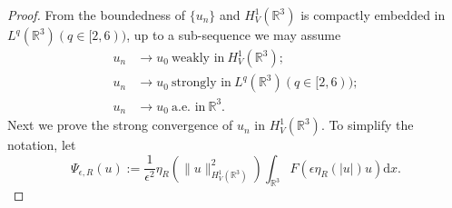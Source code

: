 \documentclass[12pt]{amsart}
\numberwithin{equation}{section}
\theoremstyle{definition}
\begin{document}
\begin{proof}
From the boundedness of $\{u_n\}$ and $H^{1}_{V}(\mathbb{R}^{3})$ is compactly embedded in $L^q(\mathbb{R}^3)(q\in[2,6))$, up to a sub-sequence we may assume
\begin{equation*}
		\begin{split}
	u_n&\to u_0~\text{weakly in}~H^{1}_{V}(\mathbb{R}^3);\\
	u_n&\to u_0~\text{strongly in}~L^{q}(\mathbb{R}^3)(q\in[2,6));\\
	u_n&\to u_0~\text{a.e. in}~ \mathbb{R}^3.
	\end{split}\end{equation*}
Next we prove the strong convergence of $u_{n}$ in $H_{V}^{1}\left ( \mathbb{R}^{3} \right ) $. To simplify the notation, let $$ \Psi_{\epsilon,R}\left ( u \right ):=\frac{1}{\epsilon ^{2}}\eta _{R}\left (\|u\|_{H^1_V(\mathbb{R}^3)}^{2}\right )\int_{\mathbb{R}^{3}}F\left (\epsilon \eta _{R} \left ( \left | u\right |\right )u\right )\text{d}x.$$


\end{proof}
\end{document}
